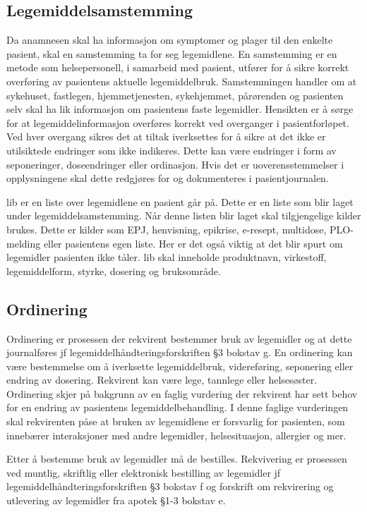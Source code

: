 \subsection{Legemiddelsamstemming}
Da anamnesen skal ha informasjon om symptomer og plager til den enkelte pasient, skal en samstemming ta for seg legemidlene. En samstemming er en metode som helsepersonell, i samarbeid med pasient, utfører for å sikre korrekt overføring av pasientens aktuelle legemiddelbruk. Samstemmingen handler om at sykehuset, fastlegen, hjemmetjenesten, sykehjemmet, pårørenden og pasienten selv skal ha lik informasjon om pasientens faste legemidler. Hensikten er å sørge for at legemiddelinformasjon overføres korrekt ved overganger i pasientforløpet. Ved hver overgang sikres det at tiltak iverksettes for å sikre at det ikke er utilsiktede endringer som ikke indikeres. Dette kan være endringer i form av seponeringer, doseendringer eller ordinasjon. Hvis det er uoverensstemmelser i opplysningene skal dette redgjøres for og dokumenteres i pasientjournalen. 

\gls{lib} er en liste over legemidlene en pasient går på. Dette er en liste som blir laget under legemiddelsamstemming. Når denne listen blir laget skal tilgjengelige kilder brukes. Dette er kilder som EPJ, henvisning, epikrise, e-resept, multidose, PLO-melding eller pasientens egen liste. Her er det også viktig at det blir spurt om legemidler pasienten ikke tåler. \gls{lib} skal inneholde produktnavn, virkestoff, legemiddelform, styrke, dosering og bruksområde.\citep{Legemiddelverket_LMG}
 
\subsection{Ordinering}
Ordinering er prosessen der rekvirent bestemmer bruk av legemidler og at dette journalføres jf legemiddelhåndteringsforskriften §3 bokstav g. En ordinering kan være bestemmelse om å iverksette legemiddelbruk, videreføring, seponering eller endring av dosering. Rekvirent kan være lege, tannlege eller helsesøster. Ordinering skjer på bakgrunn av en faglig vurdering der rekvirent har sett behov for en endring av  pasientens legemiddelbehandling. I denne faglige vurderingen skal rekvirenten påse at bruken av legemidlene er forsvarlig for pasienten, som innebærer interaksjoner med andre legemidler, helsesituasjon, allergier og mer. 

Etter å bestemme bruk av legemidler må de bestilles. Rekvivering er prosessen ved muntlig, skriftlig eller elektronisk bestilling av legemidler jf legemiddelhåndteringsforskriften §3 bokstav f og forskrift om rekvirering og utlevering av legemidler fra apotek §1-3 bokstav e.  

